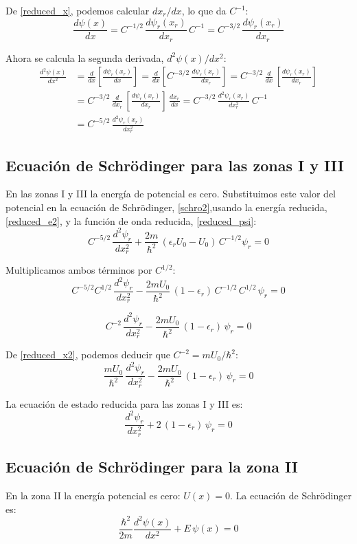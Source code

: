 De \ref{reduced_x}, podemos calcular $dx_r/dx$, lo que da $C^{-1}$:
\[
\frac{d\psi(x)}{dx}
= C^{-1/2}\,\frac{d\psi_r(x_r)}{dx_r}\,C^{-1}
= C^{-3/2}\,\frac{d\psi_r(x_r)}{dx_r}
\]

Ahora se calcula la segunda derivada, $d^2\psi(x)/dx^2$:
\begin{align*}
\frac{d^2\psi(x)}{dx^2}
&= \frac{d}{dx}\left[\frac{d\psi_r(x_r)}{dx}\right]
= \frac{d}{dx}\left[C^{-3/2}\,\frac{d\psi_r(x_r)}{dx_r}\right]
= C^{-3/2}\,\frac{d}{dx}\,\left[\frac{d\psi_r(x_r)}{dx_r}\right]\\
&= C^{-3/2}\,\frac{d}{dx_r}\,\left[\frac{d\psi_r(x_r)}{dx_r}\right]
	\,\frac{dx_r}{dx}
= C^{-3/2}\,\frac{d^2\psi_r(x_r)}{dx_r^2} \,C^{-1}\\
&= C^{-5/2}\,\frac{d^2\psi_r(x_r)}{dx_r^2}
\end{align*}

\subsection{Ecuación de Schrödinger para las zonas I y III}
En las zonas I y III la energía de potencial es cero.
Substituimos este valor del potencial en la ecuación de Schrödinger,
\ref{schro2},usando la energía reducida, \ref{reduced_e2}, y la función de
onda reducida, \ref{reduced_psi}:
\[
C^{-5/2}\,\frac{d^2\psi_r}{dx_r^2}
	 + \frac{2m}{\hbar^2}\,(\epsilon_r U_0-U_0)\,C^{-1/2}\psi_r=0
\]

Multiplicamos ambos términos por $C^{1/2}$:
\[
C^{-5/2}C^{1/2}\,\frac{d^2\psi_r}{dx_r^2}
	 - \frac{2mU_0}{\hbar^2}\,(1-\epsilon_r)\,C^{-1/2}\,C^{1/2}\,\psi_r=0
\]

\[
C^{-2}\,\frac{d^2\psi_r}{dx_r^2}
	 - \frac{2mU_0}{\hbar^2}\,(1-\epsilon_r)\,\psi_r=0
\]

De \ref{reduced_x2}, podemos deducir que $C^{-2}=mU_0/\hbar^2$:
\[
\frac{mU_0}{\hbar^2}\,\frac{d^2\psi_r}{dx_r^2}
	 - \frac{2mU_0}{\hbar^2}\,(1-\epsilon_r)\,\psi_r=0
\]

La ecuación de estado reducida para las zonas I y III es:
\begin{equation}
\frac{d^2\psi_r}{dx_r^2} + 2\,(1-\epsilon_r)\,\psi_r=0
\end{equation}

\subsection{Ecuación de Schrödinger para la zona II}
En la zona II la energía potencial es cero: $U(x) = 0$.
La ecuación de Schrödinger es:
\[
\label{schro2}
\frac{\hbar^2}{2m}\frac{d^2\psi(x)}{dx^2} + E\,\psi(x) = 0
\]

